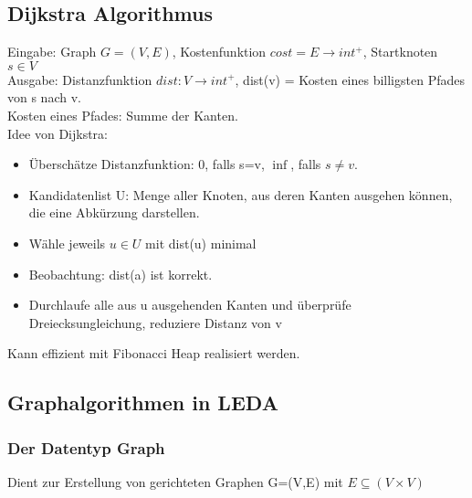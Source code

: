 \documentclass[a4paper]{article}
\begin{document}
\subsection*{Dijkstra Algorithmus}
Eingabe: Graph $G=(V,E)$, Kostenfunktion $cost=E\rightarrow int^+$, Startknoten $s\in V$\\
Ausgabe: Distanzfunktion $dist:V\rightarrow int^+$, dist(v) = Kosten eines billigsten Pfades von s nach v.\\
\hspace*{1cm}Kosten eines Pfades: Summe der Kanten.\\
Idee von Dijkstra:\\
\begin{itemize}
\item Überschätze Distanzfunktion: 0, falls s=v, $\inf$, falls $s\neq v$.
\item Kandidatenlist U: Menge aller Knoten, aus deren Kanten ausgehen können, die eine Abkürzung darstellen.
\item Wähle jeweils $u\in U$ mit dist(u) minimal
\item Beobachtung: dist(a) ist korrekt.
\item Durchlaufe alle aus u ausgehenden Kanten und überprüfe Dreiecksungleichung, reduziere Distanz von v
\end{itemize}
Kann effizient mit Fibonacci Heap realisiert werden.
\subsection*{Graphalgorithmen in LEDA}
\subsubsection*{Der Datentyp Graph}
Dient zur Erstellung von gerichteten Graphen G=(V,E) mit $E \subseteq (V \times V)$\\
\end{document}

